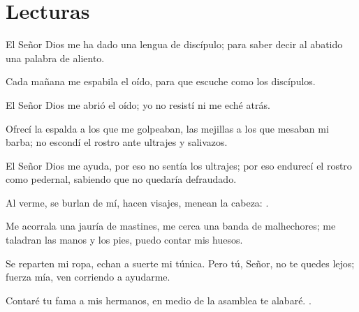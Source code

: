 
\newsection
\section{Lecturas}


 



\begin{readprose}
El Señor Dios me ha dado una lengua de discípulo; 
   para saber decir al abatido una palabra de aliento. 

Cada mañana me espabila el oído, 
   para que escuche como los discípulos.
   
El Señor Dios me abrió el oído; 
   yo no resistí ni me eché atrás.

Ofrecí la espalda a los que me golpeaban, 
   las mejillas a los que mesaban mi barba; 
   no escondí el rostro ante ultrajes y salivazos.

El Señor Dios me ayuda, 
   por eso no sentía los ultrajes; 
   por eso endurecí el rostro como pedernal, 
   sabiendo que no quedaría defraudado.\end{readprose}

\newpage
{}

 


\begin{psbody}
Al verme, se burlan de mí,
hacen visajes, menean la cabeza:
. 

Me acorrala una jauría de mastines,
me cerca una banda de malhechores;
me taladran las manos y los pies,
puedo contar mis huesos. 

Se reparten mi ropa,
echan a suerte mi túnica.
Pero tú, Señor, no te quedes lejos;
fuerza mía, ven corriendo a ayudarme. 

Contaré tu fama a mis hermanos,
en medio de la asamblea te alabaré.
. 
\end{psbody}

\newpage
{}

